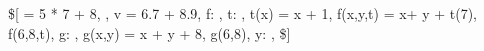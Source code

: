 \$[
\sigma = 5 * 7 + 8,
\sigma,
v = 6.7 + 8.9,
f: \Z \rightarrow \Z,
t: \Z \rightarrow \Z,
t(x) = x + 1,
f(x,y,t)  = x+ y + t(7),
f(6,8,t),
g: \Z \rightarrow \Z,
g(x,y) = x + y + 8,
g(6,8),
y: \R \rightarrow \R,
\$]

